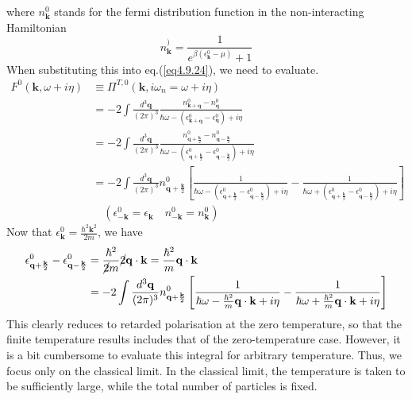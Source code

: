  where $n_{\mathbf k}^0$ stands for the fermi distribution function in the non-interacting Hamiltonian
\[
n^)_{\mathbf k}=\frac{1}{e^{\beta(\epsilon_{\mathbf k}^0-\mu)}+1}
\]
 When substituting this into eq.(\ref{eq4.9.24}), we need to evaluate.
\[
\begin{aligned}
F^0(\mathbf k,\omega+i\eta)&\equiv\Pi^{T,0}(\mathbf k,i\omega_n=\omega+i\eta)\\
&=-2\int \frac{d^3\mathbf q}{(2\pi)^3} \frac{n^0_{\mathbf k+\mathbf q}-n^0_{\mathbf q}}{\hbar\omega-(\epsilon^0_{\mathbf k+\mathbf q}-\epsilon^0_{\mathbf q})+i\eta}\\
&=-2\int \frac{d^3\mathbf q}{(2\pi)^3} \frac{n^0_{\mathbf q+\frac{\mathbf k}{2}}-n^0_{\mathbf q-\frac{\mathbf k}{2}}}{\hbar\omega-(\epsilon^0_{\mathbf q+\frac{\mathbf k}{2}}-\epsilon^0_{\mathbf q-\frac{\mathbf k}{2}})+i\eta}\\
&=-2\int \frac{d^3\mathbf q}{(2\pi)^3} n^0_{\mathbf q+\frac{\mathbf k}{2}} \left[ \frac{1}{\hbar \omega-(\epsilon^0_{\mathbf q+\frac{\mathbf k}{2}}-\epsilon^0_{\mathbf q-\frac{\mathbf k}{2}})+i\eta}-\frac{1}{\hbar \omega+(\epsilon^0_{\mathbf q+\frac{\mathbf k}{2}}-\epsilon^0_{\mathbf q-\frac{\mathbf k}{2}})+i\eta} \right]\\
&\quad(\epsilon^0_{-\mathbf k}=\epsilon_{\mathbf k}\quad n^0_{-\mathbf k} =n^0_{\mathbf k}) 
\end{aligned}
\]
Now that $\epsilon_{\mathbf k}^0=\frac{\hbar^2 \mathbf k^2}{2m}$, we have 
\begin{equation}
\begin{aligned}
\epsilon^0_{\mathbf q+\frac{\mathbf k}{2}}-\epsilon^0_{\mathbf q-\frac{\mathbf k}{2}}&=\frac{\hbar^2}{\cancel{2}m}\cancel{2}\mathbf q\cdot \mathbf k=\frac{\hbar^2}{m}\mathbf q\cdot \mathbf k\\
&=-2\int \frac{d^3\mathbf q}{(2\pi)^3} n^0_{\mathbf q+\frac{\mathbf k}{2}} \left[ \frac{1}{\hbar \omega-\frac{\hbar^2}{m} \mathbf q\cdot\mathbf k+i\eta}-\frac{1}{\hbar \omega+\frac{\hbar^2}{m} \mathbf q\cdot\mathbf k+i\eta} \right]
\end{aligned}
\end{equation}
 This clearly reduces to retarded polarisation at the zero temperature, so that the finite temperature results includes that of the zero-temperature case.
 However, it is a bit cumbersome to evaluate this integral for arbitrary temperature.
 Thus, we focus only on the classical limit.
 In the classical limit, the temperature is taken to be sufficiently large, while the total number of particles is fixed.
